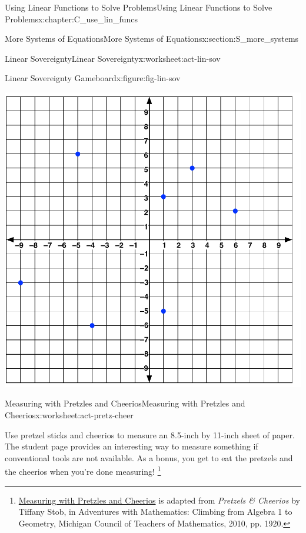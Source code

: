\documentclass[oneside,10pt,]{book}
\newcommand{\pubtitle}[1]{\textsl{#1}}
\numberwithin{equation}{chapter}
\begin{document}
\begin{chapterptx}{Using Linear Functions to Solve Problems}{}{Using Linear Functions to Solve Problems}{}{}{x:chapter:C_use_lin_funcs}
\begin{sectionptx}{More Systems of Equations}{}{More Systems of Equations}{}{}{x:section:S_more_systems}
\begin{worksheet-subsection}{Linear Sovereignty}{}{Linear Sovereignty}{}{}{x:worksheet:act-lin-sov}
\begin{figureptx}{Linear Sovereignty Gameboard}{x:figure:fig-lin-sov}{}
\begin{image}{0}{1}{0}
\includegraphics[width=\linewidth]{external/lin-sov.pdf}
\end{image}%
\tcblower
\end{figureptx}%
\end{worksheet-subsection}
\restoregeometry
%
%
\typeout{************************************************}
\typeout{************************************************}
%
\begin{worksheet-subsection}{Measuring with Pretzles and Cheerios}{}{Measuring with Pretzles and Cheerios}{}{}{x:worksheet:act-pretz-cheer}
\begin{introduction}{}%
Use pretzel sticks and cheerios to measure an 8.5-inch by 11-inch sheet of paper. The student page provides an interesting way to measure something if conventional tools are not available. As a bonus, you get to eat the pretzels and the cheerios when you're done measuring! \footnote{\hyperref[x:worksheet:act-pretz-cheer]{Measuring with Pretzles and Cheerios} is adapted from \pubtitle{Pretzels \& Cheerios} by Tiffany Stob, in Adventures with Mathematics: Climbing from Algebra 1 to Geometry, Michigan Council of Teachers of Mathematics, 2010, pp. 19\textemdash{}20.\label{g:fn:idp1710958472}}%
\end{introduction}%

\end{worksheet-subsection}
\end{sectionptx}
\end{chapterptx}
\end{document}
